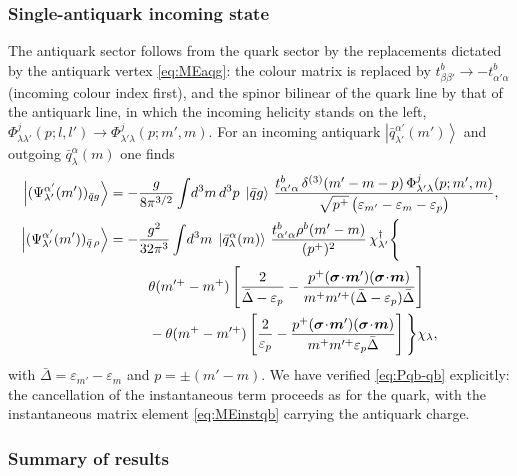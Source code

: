 \documentclass[11pt,a4paper]{article}
\numberwithin{equation}{section}
\newcommand{\eps}{\varepsilon}
\newcommand{\dg}{\dagger}
\newcommand{\dthree}{\delta^{(3)}}
\newcommand{\ket}[1]{\left|#1\right\rangle}
\newcommand{\Ph}{\Phi}
\newcommand{\aqk}[3]{\bar q^{#1}_{#2}(#3)}
\begin{document}
\subsubsection{Single-antiquark incoming state}

The antiquark sector follows from the quark sector by the replacements dictated by the
antiquark vertex \eqref{eq:MEaqg}: the colour matrix is replaced by
$t^{b}_{\beta\beta'}\to-t^{b}_{\alpha'\alpha}$ (incoming colour index first), and the spinor
bilinear of the quark line by that of the antiquark line, in which the incoming helicity stands
on the left, $\Ph^{j}_{\lambda\lambda'}(p;l,l')\to\Ph^{j}_{\lambda'\lambda}(p;m',m)$. For an incoming
antiquark $\ket{\aqk{\alpha'}{\lambda'}{m'}}$ and outgoing $\aqk{\alpha}{\lambda}{m}$ one finds
\begin{align}
\ket{(\Psi^{\alpha'}_{\lambda'}(m'))_{\bar qg}}&=-\frac{g}{8\pi^{3/2}}\int\!d^{3}m\,d^{3}p\;\ket{\bar q g}\,
\frac{t^{b}_{\alpha'\alpha}\,\dthree(m'-m-p)\,\Ph^{j}_{\lambda'\lambda}(p;m',m)}{\sqrt{p^{+}}\,\big(\eps_{m'}-\eps_{m}-\eps_{p}\big)},
\label{eq:Pqb-qbg}\\
\ket{(\Psi^{\alpha'}_{\lambda'}(m'))_{\bar q\,\rho}}&=-\frac{g^{2}}{32\pi^{3}}\int\!d^{3}m\;\ket{\aqk{\alpha}{\lambda}{m}}\,
\frac{t^{b}_{\alpha'\alpha}\rho^{b}(m'-m)}{(p^{+})^{2}}\,\chi^{\dg}_{\lambda'}\Bigg\{
\nonumber\\&\hspace{1.0cm}
\theta(m'^{+}-m^{+})\left[\frac{2}{\bar\Delta-\eps_{p}}
-\frac{p^{+}(\bm\sigma\!\cdot\!\bm m')(\bm\sigma\!\cdot\!\bm m)}{m^{+}m'^{+}(\bar\Delta-\eps_{p})\bar\Delta}\right]
\nonumber\\
&\hspace{1.0cm}-\theta(m^{+}-m'^{+})\left[\frac{2}{\eps_{p}}
-\frac{p^{+}(\bm\sigma\!\cdot\!\bm m')(\bm\sigma\!\cdot\!\bm m)}{m^{+}m'^{+}\eps_{p}\bar\Delta}\right]\Bigg\}\chi_{\lambda},
\label{eq:Pqb-qb}
\end{align}
with $\bar\Delta=\eps_{m'}-\eps_{m}$ and $p=\pm(m'-m)$. We have verified \eqref{eq:Pqb-qb}
explicitly: the cancellation of the instantaneous term proceeds as for the quark, with the
instantaneous matrix element \eqref{eq:MEinstqb} carrying the antiquark charge.

\subsubsection{Summary of results}
\label{sec:sum-q}
\end{document}
